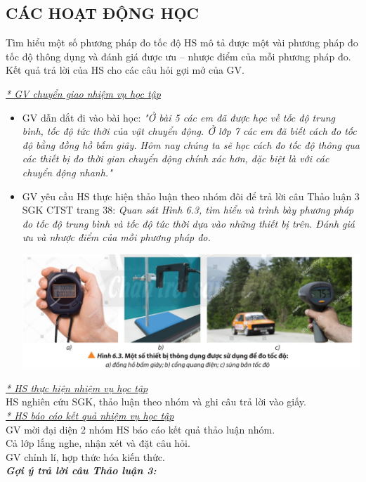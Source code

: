 \subsection{CÁC HOẠT ĐỘNG HỌC}
\hoatdong
{Tìm hiểu một số phương pháp đo tốc độ
}
{HS mô tả được một vài phương pháp đo tốc độ thông dụng và đánh giá được ưu – nhược điểm của mỗi phương pháp đo.
}
{Kết quả trả lời của HS cho các câu hỏi gợi mở của GV.
}
{\textit{\underline{* GV chuyển giao nhiệm vụ học tập}}
	\begin{itemize}[label=-]
		\item GV dẫn dắt đi vào bài học: \textit{"Ở bài 5 các em đã được học về tốc độ trung bình, tốc độ tức thời của vật chuyển động. Ở lớp 7 các em đã biết cách đo tốc độ bằng đồng hồ bấm giây. Hôm nay chúng ta sẽ học cách đo tốc độ thông qua các thiết bị đo thời gian chuyển động chính xác hơn, đặc biệt là với các chuyển động nhanh."}
		\item GV yêu cầu HS thực hiện thảo luận theo nhóm đôi để trả lời câu Thảo luận 3  SGK CTST trang 38: \textit{Quan sát Hình 6.3, tìm hiểu và trình bày phương pháp đo tốc độ trung bình và tốc độ tức thời dựa vào những thiết bị trên. Đánh giá ưu và nhược điểm của mỗi phương pháp đo.}
		\begin{center}
			\includegraphics[scale=0.6]{figs/G10-BAI6-1}
		\end{center}
	\end{itemize}
	\textit{\underline{* HS thực hiện nhiệm vụ học tập}}\\
	HS nghiên cứu SGK, thảo luận theo nhóm và ghi câu trả lời vào giấy.\\
	\textit{\underline{* HS báo cáo kết quả nhiệm vụ học tập}}\\
	GV mời đại diện 2 nhóm HS báo cáo kết quả thảo luận nhóm. \\
	Cả lớp lắng nghe, nhận xét và đặt câu hỏi.\\
	GV chỉnh lí, hợp thức hóa kiến thức.\\
	\textbf{\textit{Gợi ý trả lời câu Thảo luận 3:}}
}
